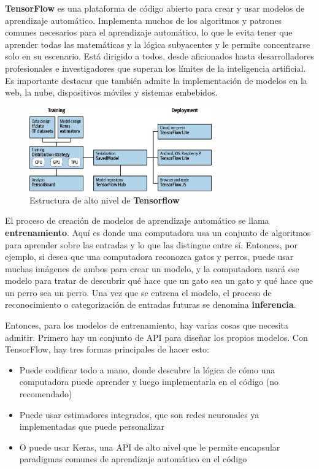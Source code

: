 \textbf{TensorFlow} es una plataforma de código abierto para crear y usar modelos de aprendizaje automático. Implementa muchos de los algoritmos y patrones comunes necesarios para el aprendizaje automático, lo que le evita tener que aprender todas las matemáticas y la lógica subyacentes y le permite concentrarse solo en su escenario. Está dirigido a todos, desde aficionados hasta desarrolladores profesionales e investigadores que superan los límites de la inteligencia artificial. Es importante destacar que también admite la implementación de modelos en la web, la nube, dispositivos móviles y sistemas embebidos.

\begin{figure}[htb]
	\centering
	\includegraphics[width=0.7\textwidth]{capitulo3/TFarquitectura.jpg}
	\caption{Estructura de alto nivel de \textbf{Tensorflow}}
	\label{cap3:001}
\end{figure} 

El proceso de creación de modelos de aprendizaje automático se llama \textbf{entrenamiento}. Aquí es donde una computadora usa un conjunto de algoritmos para aprender sobre las entradas y lo que las distingue entre sí. Entonces, por ejemplo, si desea que una computadora reconozca gatos y perros, puede usar muchas imágenes de ambos para crear un modelo, y la computadora usará ese modelo para tratar de descubrir qué hace que un gato sea un gato y qué hace que un perro sea un perro. Una vez que se entrena el modelo, el proceso de reconocimiento o categorización de entradas futuras se denomina \textbf{inferencia}.

Entonces, para los modelos de entrenamiento, hay varias cosas que necesita admitir. Primero hay un conjunto de API para diseñar los propios modelos. Con TensorFlow, hay tres formas principales de hacer esto: 
\begin{itemize}
	\item Puede codificar todo a mano, donde descubre la lógica de cómo una computadora puede aprender y luego implementarla en el código (no recomendado)
	\item Puede usar estimadores integrados, que son redes neuronales ya implementadas que puede personalizar
	\item O puede usar Keras, una API de alto nivel que le permite encapsular paradigmas comunes de aprendizaje automático en el código
\end{itemize}

